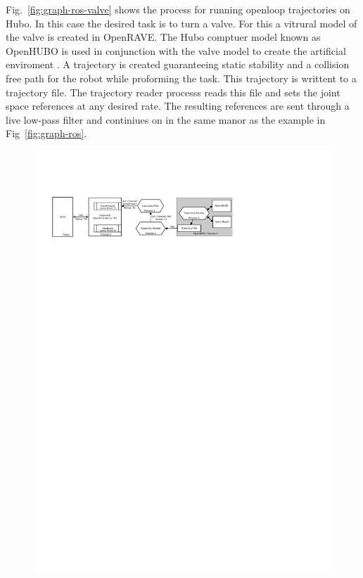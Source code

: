 Fig.~\ref{fig:graph-ros-valve} shows the process for running openloop trajectories on Hubo. 
In this case the desired task is to turn a valve.
For this a vitrural model of the valve is created in OpenRAVE.
The Hubo comptuer model known as OpenHUBO is used in conjunction with the valve model to create the artificial enviroment \cite{jaemi-hubo-first}.
A trajectory is created guaranteeing static stability and a collision free path for the robot while proforming the task.
This trajectory is writtent to a trajectory file.
The trajectory reader processs reads this file and sets the joint space references at any desired rate.
The resulting references are sent through a live low-pass filter and continiues on in the same manor as the example in Fig~\ref{fig:graph-ros}.

\begin{figure}[thpb]
  \centering
\includegraphics[width=2.0\columnwidth]{./pix/hubo-ach-diagram-openhubo-valve.pdf}

\end{figure}
